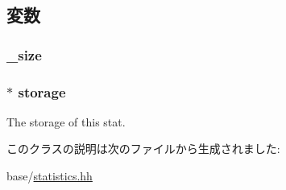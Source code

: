 \subsection{変数}
\hypertarget{classStats_1_1VectorBase_a9f1927ae81f20205d93e0b86915f27d7}{
\subsubsection[{\_\-size}]{ {\bf \_\-size}}}
\label{classStats_1_1VectorBase_a9f1927ae81f20205d93e0b86915f27d7}
\hypertarget{classStats_1_1VectorBase_a1b410f65a3077609e9b1902c52136304}{
\subsubsection[{storage}]{$\ast$ {\bf storage}}}
\label{classStats_1_1VectorBase_a1b410f65a3077609e9b1902c52136304}
The storage of this stat. 

このクラスの説明は次のファイルから生成されました:\begin{DoxyCompactItemize}
\item 
base/\hyperlink{statistics_8hh}{statistics.hh}\end{DoxyCompactItemize}
